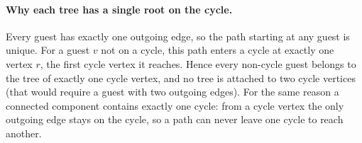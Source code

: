 \documentclass[11pt]{article}
\begin{document}
\paragraph{Why each tree has a single root on the cycle.}
Every guest has exactly one outgoing edge, so the path starting at any guest is unique. For a guest $v$ not on a cycle, this path enters a cycle at exactly one vertex $r$, the first cycle vertex it reaches. Hence every non-cycle guest belongs to the tree of exactly one cycle vertex, and no tree is attached to two cycle vertices (that would require a guest with two outgoing edges). For the same reason a connected component contains exactly one cycle: from a cycle vertex the only outgoing edge stays on the cycle, so a path can never leave one cycle to reach another.
\end{document}
